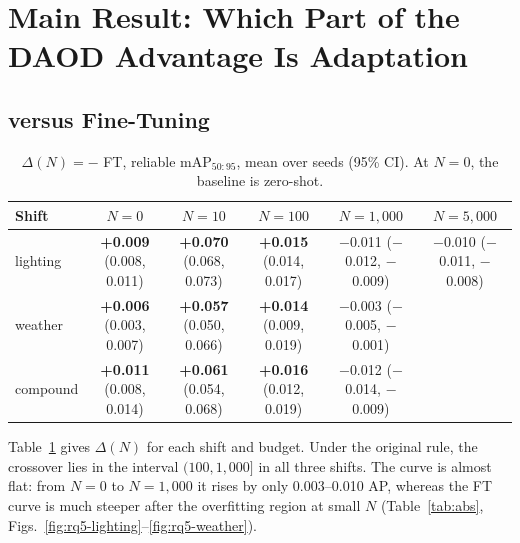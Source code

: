 \section{Main Result: Which Part of the DAOD Advantage Is Adaptation}\label{sec:main}

\subsection{\texorpdfstring{\aldi}{ALDI++} versus Fine-Tuning}\label{sec:aldi-vs-ft}

\begin{table}[t]
\centering
\caption{$\Delta(N) = {}$\aldi $-$ FT, reliable mAP$_{50:95}$, mean over seeds (95\% CI). At $N = 0$, the baseline is zero-shot.}
\label{tab:delta}
\footnotesize
\setlength{\tabcolsep}{3pt}
\begin{tabular}{@{}lccccc@{}}
\toprule
Shift & $N = 0$ & $N = 10$ & $N = 100$ & $N = 1{,}000$ & $N = 5{,}000$ \\
\midrule
lighting & \textbf{+0.009} (0.008, 0.011) & \textbf{+0.070} (0.068, 0.073) & \textbf{+0.015} (0.014, 0.017) & $-$0.011 ($-$0.012, $-$0.009) & $-$0.010 ($-$0.011, $-$0.008) \\
weather & \textbf{+0.006} (0.003, 0.007) & \textbf{+0.057} (0.050, 0.066) & \textbf{+0.014} (0.009, 0.019) & $-$0.003 ($-$0.005, $-$0.001) & \\
compound & \textbf{+0.011} (0.008, 0.014) & \textbf{+0.061} (0.054, 0.068) & \textbf{+0.016} (0.012, 0.019) & $-$0.012 ($-$0.014, $-$0.009) & \\
\bottomrule
\end{tabular}
\end{table}

Table~\ref{tab:delta} gives $\Delta(N)$ for each shift and budget. Under the original rule, the crossover \Nx lies in the interval $(100, 1{,}000]$ in all three shifts. The \aldi curve is almost flat: from $N = 0$ to $N = 1{,}000$ it rises by only 0.003--0.010 AP, whereas the FT curve is much steeper after the overfitting region at small $N$ (Table~\ref{tab:abs}, Figs.~\ref{fig:rq5-lighting}--\ref{fig:rq5-weather}).

